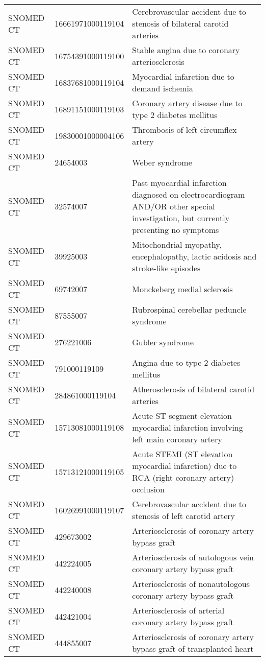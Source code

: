\begin{longtable}{p{}p{}p{}}
  SNOMED CT & 16661971000119104 & Cerebrovascular accident due to stenosis of bilateral carotid arteries \\ 
  SNOMED CT & 16754391000119100 & Stable angina due to coronary arteriosclerosis \\ 
  SNOMED CT & 16837681000119104 & Myocardial infarction due to demand ischemia \\ 
  SNOMED CT & 16891151000119103 & Coronary artery disease due to type 2 diabetes mellitus \\ 
  SNOMED CT & 19830001000004106 & Thrombosis of left circumflex artery \\ 
  SNOMED CT & 24654003 & Weber syndrome \\ 
  SNOMED CT & 32574007 & Past myocardial infarction diagnosed on electrocardiogram AND/OR other special investigation, but currently presenting no symptoms \\ 
  SNOMED CT & 39925003 & Mitochondrial myopathy, encephalopathy, lactic acidosis and stroke-like episodes \\ 
  SNOMED CT & 69742007 & Monckeberg medial sclerosis \\ 
  SNOMED CT & 87555007 & Rubrospinal cerebellar peduncle syndrome \\ 
  SNOMED CT & 276221006 & Gubler syndrome \\ 
  SNOMED CT & 791000119109 & Angina due to type 2 diabetes mellitus \\ 
  SNOMED CT & 284861000119104 & Atherosclerosis of bilateral carotid arteries \\ 
  SNOMED CT & 15713081000119108 & Acute ST segment elevation myocardial infarction involving left main coronary artery \\ 
  SNOMED CT & 15713121000119105 & Acute STEMI (ST elevation myocardial infarction) due to RCA (right coronary artery) occlusion \\ 
  SNOMED CT & 16026991000119107 & Cerebrovascular accident due to stenosis of left carotid artery \\ 
  SNOMED CT & 429673002 & Arteriosclerosis of coronary artery bypass graft \\ 
  SNOMED CT & 442224005 & Arteriosclerosis of autologous vein coronary artery bypass graft \\ 
  SNOMED CT & 442240008 & Arteriosclerosis of nonautologous coronary artery bypass graft \\ 
  SNOMED CT & 442421004 & Arteriosclerosis of arterial coronary artery bypass graft \\ 
  SNOMED CT & 444855007 & Arteriosclerosis of coronary artery bypass graft of transplanted heart \\ 

\end{longtable}
